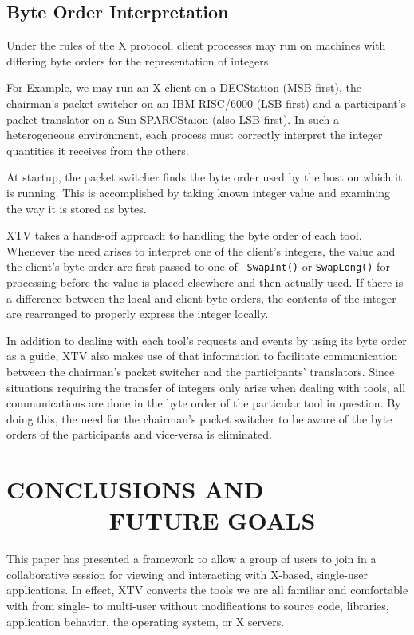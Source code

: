 \subsection{Byte Order Interpretation}

Under the rules of the X protocol, client processes may run on machines
with differing byte orders for the representation of integers.

For Example, we may run an X client on a DECStation (MSB first), the
chairman's packet switcher on an IBM RISC/6000 (LSB first) and a
participant's packet translator on a Sun SPARCStaion (also LSB first).
In such a heterogeneous environment, each process must correctly
interpret the integer quantities it receives from the others.

At startup, the packet switcher finds the byte order used by the host
on which it is running.  This is accomplished by taking known integer
value and examining the way it is stored as bytes.

XTV takes a hands-off approach to handling the byte order of each tool.
Whenever the need arises to interpret one of the client's integers, the
value and the client's byte order are first passed to one of {\tt
SwapInt()} or {\tt SwapLong()} for processing before the value is
placed elsewhere and then actually used.  If there is a difference
between the local and client byte orders, the contents of the integer
are rearranged to properly express the integer locally.  

In addition to dealing with each tool's requests and events by using
its byte order as a guide, XTV also makes use of that information to
facilitate communication between the chairman's packet switcher and
the participants' translators.  Since situations requiring the transfer of
integers only arise when dealing with tools, all communications are
done in the byte order of the particular tool in question.  By doing
this, the need for the chairman's packet switcher to be aware of the
byte orders of the participants and vice-versa is eliminated.

%
%
\section{CONCLUSIONS AND \ \ \ \ \ \ \ \ 
FUTURE GOALS}


This paper has presented a framework to allow a group of users to join
in a collaborative session for viewing and interacting with X-based,
single-user applications.  In effect, XTV converts the tools we are all
familiar and comfortable with from single- to multi-user without
modifications to source code, libraries, application behavior, the
operating system, or X servers.

